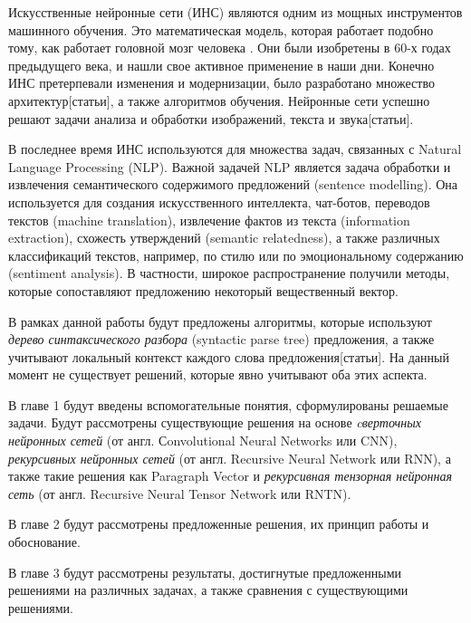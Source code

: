 \startprefacepage

Искусственные нейронные сети (ИНС) являются одним из мощных инструментов машинного
обучения.
Это математическая модель, которая работает подобно тому, как работает головной
мозг человека \cite{rosenblatt58a}.
Они были изобретены в 60-х годах предыдущего века\cite{rosenblatt58a}, и нашли свое активное
применение в наши дни. Конечно ИНС претерпевали изменения и модернизации, было разработано множество архитектур[статьи], а также алгоритмов обучения\cite{Duchi2011, zeiler2012, rprop93}.
Нейронные сети успешно решают задачи анализа и обработки изображений, текста и
звука[статьи].

В последнее время ИНС используются для множества задач, связанных с Natural
Language Processing (NLP). Важной задачей NLP является задача 
обработки и извлечения семантического содержимого предложений (sentence modelling).
Она используется для создания искусственного интеллекта, чат-ботов,
переводов текстов (machine translation), извлечение фактов из текста (information
extraction), схожесть утверждений (semantic relatedness), 
а также различных классификаций текстов, например,
по стилю или по эмоциональному содержанию (sentiment analysis).
В частности, широкое распространение получили методы, которые сопоставляют предложению некоторый вещественный вектор.

В рамках данной работы будут предложены алгоритмы, которые используют \emph{дерево синтаксического разбора} (syntactic parse tree) предложения, а также учитывают локальный контекст каждого слова предложения[статьи]. На данный момент не существует решений, которые явно учитывают оба этих аспекта.

В главе 1 будут введены вспомогательные понятия, сформулированы решаемые задачи.
Будут рассмотрены существующие решения на основе \emph{cверточных нейронных сетей} (от англ. Сonvolutional Neural Networks или CNN), \emph{рекурсивных нейронных сетей} (от англ. Recursive Neural Network или RNN), а также такие решения как Paragraph Vector и \emph{рекурсивная тензорная нейронная сеть} (от англ. Recursive Neural Tensor Network или RNTN).

В главе 2 будут рассмотрены предложенные решения, их принцип работы и обоснование.

В главе 3 будут рассмотрены результаты, достигнутые предложенными решениями на различных задачах, а также сравнения с существующими решениями.
